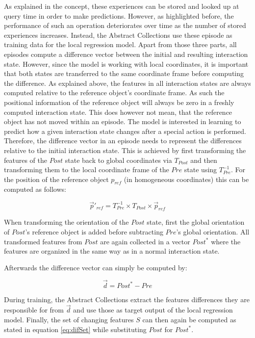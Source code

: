 As explained in the concept, these experiences can be stored and looked up at query time in order to make predictions. However, as highlighted before, the performance of such an operation deteriorates over time as the number of stored experiences increases. Instead, the Abstract Collections use these episode as training data for the local regression model. Apart from those three parts, all episodes compute a difference vector between the initial and resulting interaction state. 
However, since the model is working with local coordinates, it is important that both states are transferred to the same coordinate frame before computing the difference. As explained above, the features in all interaction states are always computed relative to the reference object's coordinate frame. As such the positional information of the reference object will always be zero in a freshly computed interaction state. This does however not mean, that the reference object has not moved within an episode. The model is interested in learning to predict how a given interaction state changes after a special action is performed. Therefore, the difference vector in an episode needs to represent the differences relative to the initial interaction state. This is achieved by first transforming the features of the $Post$ state back to global coordinates via $T_{Post}$ and then transforming them to the local coordinate frame of the $Pre$ state using $T^{-1}_{Pre}$. For the position of the reference object $p_{ref}$ (in homogeneous coordinates) this can be computed as follows:

\begin{equation}
\vec{p}'_{ref} = T^{-1}_{Pre} \times T_{Post} \times \vec{p}_{ref}
\end{equation}

When transforming the orientation of the $Post$ state, first the global orientation of $Post$'s reference object is added before subtracting $Pre$'s global orientation. All transformed features from $Post$ are again collected in a vector $Post^*$ where the features are organized in the same way as in a normal interaction state.

Afterwards the difference vector can simply be computed by:

\begin{equation}
\vec{d} = Post^* - Pre
\end{equation}

During training, the Abstract Collections extract the features differences they are responsible for from $\vec{d}$ and use those as target output of the local regression model.
Finally, the set of changing features $S$ can then again be computed as stated in equation \ref{eq:difSet} while substituting $Post$ for $Post^*$.

